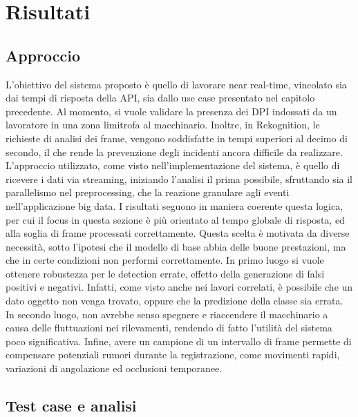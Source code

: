 \chapter{Risultati}

\section{Approccio}
L'obiettivo del sistema proposto è quello di lavorare near real-time, vincolato sia dai tempi di risposta della API, sia dallo use case presentato nel capitolo precedente. Al momento, si vuole validare la presenza dei DPI indossati da un lavoratore in una zona limitrofa al macchinario. %
Inoltre, in Rekognition, le richieste di analisi dei frame, vengono soddisfatte in tempi superiori al decimo di secondo, il che rende la prevenzione degli incidenti ancora difficile da realizzare. L'approccio utilizzato, come visto nell'implementazione del sistema, è quello di ricevere i dati via streaming, iniziando l'analisi il prima possibile, sfruttando sia il parallelismo nel preprocessing, che la reazione granulare agli eventi nell'applicazione big data. I risultati seguono in maniera coerente questa logica, per cui il focus in questa sezione è più orientato al tempo globale di risposta, ed alla soglia di frame processati correttamente. Questa scelta è motivata da diverse necessità, sotto l'ipotesi che il modello di base abbia delle buone prestazioni, ma che in certe condizioni non performi correttamente. In primo luogo si vuole ottenere robustezza per le detection errate, effetto della generazione di falsi positivi e negativi. Infatti, come visto anche nei lavori correlati, è possibile che un dato oggetto non venga trovato, oppure che la predizione della classe sia errata. In secondo luogo, non avrebbe senso spegnere e riaccendere il macchinario a causa delle fluttuazioni nei rilevamenti, rendendo di fatto l'utilità del sistema poco significativa. Infine, avere un campione di un intervallo di frame permette di compensare potenziali rumori durante la registrazione, come movimenti rapidi, variazioni di angolazione ed occlusioni temporanee. 



\section{Test case e analisi}

